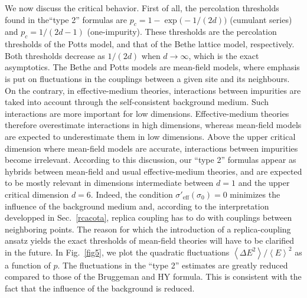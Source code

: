 We now discuss the critical behavior. First of all, the percolation
thresholds found in the``type 2'' formulas are
$p_c=1-\exp\bigl(-1/(2d)\bigr)$ (cumulant series) and $p_c=1/(2d-1)$
(one-impurity). These thresholds are the percolation thresholds of the
Potts model, and that of the Bethe lattice model, respectively. Both
thresholds decrease as $1/(2d)$ when $d\to\infty$, which is the exact
asymptotics. The Bethe and Potts models are mean-field models, where
emphasis is put on fluctuations in the couplings between a given site
and its neighbours. On the contrary, in effective-medium theories,
interactions between impurities are taked into account through the
self-consistent background medium. Such interactions are more
important for low dimensions. Effective-medium theories therefore
overestimate interactions in high dimensions, whereas mean-field
models are expected to underestimate them in low dimensions. Above the
upper critical dimension where mean-field models are accurate,
interactions between impurities become irrelevant. According to this
discussion, our ``type 2'' formulas appear as hybrids between
mean-field and usual effective-medium theories, and are expected to be
mostly relevant in dimensions intermediate between $d=1$ and the upper
critical dimension $d=6$. Indeed, the condition
$\sigma'_{\text{eff}}(\sigma_0)=0$ minimizes the influence of the
background medium and, according to the interpretation developped in
Sec.\ \ref{rcacota}, replica coupling has to do with couplings
between neighboring points. The reason for which the introduction of a
replica-coupling ansatz yields the exact thresholds of mean-field
theories will have to be clarified in the future. In Fig.\ \ref{fig5}, we plot the quadratic fluctuations $\left\langle\Delta
E^2\right\rangle/\left\langle E\right\rangle^2$ as a function of
$p$. The fluctuations in the ``type 2'' estimates are greatly reduced
compared to those of the Bruggeman and HY formula. This is consistent
with the fact that the influence of the background is reduced.

